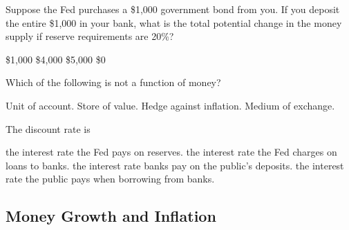 \documentclass[addpoints,11pt]{exam}
\theoremstyle{definition}
\begin{document}
\begin{questions}
\question Suppose the Fed purchases a \$1,000 government bond from you. If you deposit the entire \$1,000 in your bank, what is the total potential change in the money supply if reserve requirements are 20\%?

\begin{choices}
	\choice \$1,000
	\choice \$4,000
	\CorrectChoice \$5,000
	\choice \$0
\end{choices}

\question Which of the following is not a function of money?

\begin{choices}
	\choice Unit of account.
	\choice Store of value.
	\CorrectChoice Hedge against inflation.
	\choice Medium of exchange.
\end{choices}

\question The discount rate is 

\begin{choices}
	\choice the interest rate the Fed pays on reserves.
	\CorrectChoice the interest rate the Fed charges on loans to banks.
	\choice the interest rate banks pay on the public's deposits.
	\choice the interest rate the public pays when borrowing from banks.
\end{choices}
	
\end{questions}

\subsection*{Money Growth and Inflation}
\end{document}
